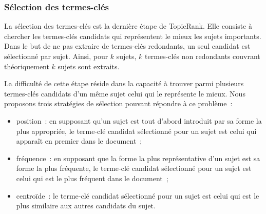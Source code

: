       \subsubsection{Sélection des termes-clés}
      \label{subsubsec:main:domain_independent_keyphrase_extraction-unsupervised_automatic_keyphrase_extraction-topicrank-keyphrase_selection}
        La sélection des termes-clés est la dernière étape de TopicRank. Elle
        consiste à chercher les termes-clés candidats qui représentent le mieux
        les sujets importants. Dans le but de ne pas extraire de termes-clés
        redondants, un seul candidat est sélectionné par sujet.
        Ainsi, pour $k$ sujets, $k$ termes-clés non redondants couvrant
        théoriquement $k$ sujets sont extraits.

        La difficulté de cette étape réside dans la capacité à trouver parmi
        plusieurs termes-clés candidats d'un même sujet celui qui le représente
        le mieux. Nous proposons trois stratégies de sélection pouvant répondre
        à ce problème~:
        \begin{itemize}
          \item{position~: en supposant qu'un sujet est tout d'abord
                introduit par sa forme la plus appropriée, le terme-clé
                candidat sélectionné pour un sujet est celui qui apparaît en
                premier dans le document~;}
          \item{fréquence~: en supposant que la forme la plus représentative
                d'un sujet est sa forme la plus fréquente, le terme-clé candidat
                sélectionné pour un sujet est celui qui est le plus fréquent
                dans le document~;}
          \item{centroïde~: le terme-clé candidat sélectionné pour un sujet
                est celui qui est le plus similaire aux autres candidats du
                sujet.}
        \end{itemize}

